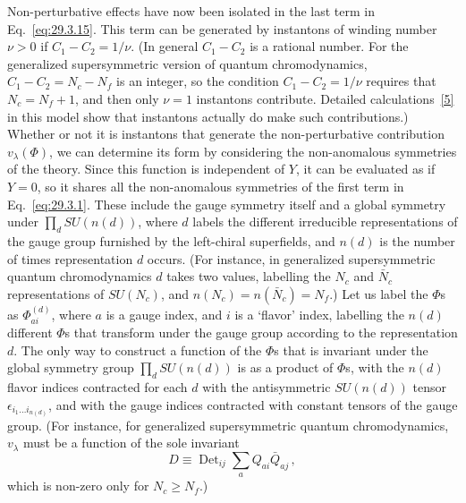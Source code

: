 Non-perturbative effects have now been isolated in the last term in
Eq.~\eqref{eq:29.3.15}. This term can be generated by instantons of winding
number \(\nu>0\) if \(C_1-C_2=1/\nu\). (In general \(C_1-C_2\) is a
rational number. For the generalized supersymmetric version of quantum
chromodynamics, \(C_1-C_2=N_c-N_f\) is an integer, so the condition
\(C_1-C_2=1/\nu\) requires that \(N_c=N_f+1\), and then only \(\nu=1\)
instantons contribute. Detailed calculations~\hyperref[ch29-ref-5]{[5]}
in this model show that instantons actually do make such contributions.)
Whether or not it is instantons that generate the non-perturbative
contribution \(v_\lambda(\Phi)\), we can determine its form by considering
the non-anomalous symmetries of the theory. Since this function is
independent of \(Y\), it can be evaluated as if \(Y=0\), so it shares all
the non-anomalous symmetries of the first term in Eq.~\eqref{eq:29.3.1}.
These include the gauge symmetry itself and a global symmetry under
\(\prod_d SU(n(d))\), where \(d\) labels the different irreducible
representations of the gauge group furnished by the left-chiral
superfields, and \(n(d)\) is the number of times representation \(d\)
occurs. (For instance, in generalized supersymmetric quantum
chromodynamics \(d\) takes two values, labelling the \(N_c\) and
\(\bar N_c\) representations of \(SU(N_c)\), and
\(n(N_c)=n(\bar N_c)=N_f\).) Let us label the \(\Phi\)s as
\(\Phi_{ai}^{(d)}\), where \(a\) is a gauge index, and \(i\) is a `flavor'
index, labelling the \(n(d)\) different \(\Phi\)s that transform under the
gauge group according to the representation \(d\). The only way to
construct a function of the \(\Phi\)s that is invariant under the global
symmetry group \(\prod_d SU(n(d))\) is as a product of \(\Phi\)s, with
the \(n(d)\) flavor indices contracted for each \(d\) with the
antisymmetric \(SU(n(d))\) tensor
\(\epsilon_{i_1\ldots i_{n(d)}}\), and with the gauge indices contracted
with constant tensors of the gauge group. (For instance, for generalized
supersymmetric quantum chromodynamics, \(v_\lambda\) must be a function of
the sole invariant
\[
  D\equiv
  \operatorname{Det}_{ij}\sum_a Q_{ai}\bar Q_{aj}\,,
\]
which is non-zero only for \(N_c\geq N_f\).)

